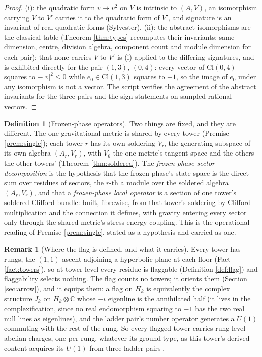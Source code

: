 \documentclass[11pt]{article}
\theoremstyle{definition}
\newtheorem{definition}[theorem]{Definition}
\newtheorem{remark}[theorem]{Remark}
\newcommand{\Cl}{\mathrm{Cl}}
\newcommand{\C}{\mathbb{C}}
\begin{document}
\begin{proof}
(i): the quadratic form $v \mapsto v^{2}$ on $V$ is intrinsic to $(A, V)$, an isomorphism carrying $V$ to $V'$ carries it to the quadratic form of $V'$, and signature is an invariant of real quadratic forms (Sylvester). (ii): the abstract isomorphisms are the classical table (Theorem \ref{thm:types} recomputes their invariants: same dimension, centre, division algebra, component count and module dimension for each pair); that none carries $V$ to $V'$ is (i) applied to the differing signatures, and is exhibited directly for the pair $(1,3)$, $(0,4)$: every vector of $\Cl(0,4)$ squares to $-|v|^{2} \leq 0$ while $e_{0} \in \Cl(1,3)$ squares to $+1$, so the image of $e_{0}$ under any isomorphism is not a vector. The script verifies the agreement of the abstract invariants for the three pairs and the sign statements on sampled rational vectors.
\end{proof}

\begin{definition}[Frozen-phase operators]\label{def:frozenops}
Two things are fixed, and they are different. The one gravitational metric is shared by every tower (Premise \ref{prem:single}); each tower $r$ has its own soldering $V_{r}$, the generating subspace of its own algebra $(A_{r}, V_{r})$, with $V_{6}$ the one metric's tangent space and the others the other towers' (Theorem \ref{thm:soldered}). The \emph{frozen-phase sector decomposition} is the hypothesis that the frozen phase's state space is the direct sum over residues of sectors, the $r$-th a module over the soldered algebra $(A_{r}, V_{r})$, and that a \emph{frozen-phase local operator} is a section of one tower's soldered Clifford bundle: built, fibrewise, from that tower's soldering by Clifford multiplication and the connection it defines, with gravity entering every sector only through the shared metric's stress-energy coupling. This is the operational reading of Premise \ref{prem:single}, stated as a hypothesis and carried as one.
\end{definition}

\begin{remark}[Where the flag is defined, and what it carries]\label{rem:flaglives}
Every tower has rungs, the $(1,1)$ ascent adjoining a hyperbolic plane at each floor (Fact \ref{fact:towers}), so at tower level every residue is flaggable (Definition \ref{def:flag}) and flaggability selects nothing. The flag counts no towers; it orients them (Section \ref{sec:arrow}), and it equips them: a flag on $H_{k}$ is equivalently the complex structure $J_{k}$ on $H_{k} \otimes \C$ whose $-i$ eigenline is the annihilated half (it lives in the complexification, since no real endomorphism squaring to $-1$ has the two real null lines as eigenlines), and the ladder pair's number operator generates a $U(1)$ commuting with the rest of the rung. So every flagged tower carries rung-level abelian charges, one per rung, whatever its ground type, as this tower's derived content acquires its $U(1)$ from three ladder pairs \cite{ButlerT12}.
\end{remark}
\end{document}
